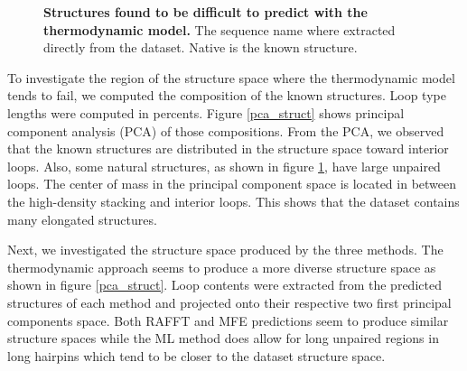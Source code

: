 \documentclass[a4paper,12pt]{article}
\begin{document}
\begin{figure}[!ht]
  \caption{\textbf{Structures found to be difficult to predict with the
      thermodynamic model.} The sequence name where extracted directly from the
    dataset. Native is the known structure.\label{diff_struct}}
\end{figure}

To investigate the region of the structure space where the thermodynamic model
tends to fail, we computed the composition of the known structures. Loop type
lengths were computed in percents. Figure \ref{pca_struct} shows principal
component analysis (PCA) of those compositions. From the PCA, we observed that
the known structures are distributed in the structure space toward interior
loops. Also, some natural structures, as shown in figure \ref{diff_struct}, have
large unpaired loops. The center of mass in the principal component space is
located in between the high-density stacking and interior loops. This shows that
the dataset contains many elongated structures.

Next, we investigated the structure space produced by the three methods. The
thermodynamic approach seems to produce a more diverse structure space as shown
in figure \ref{pca_struct}. Loop contents were extracted from the predicted
structures of each method and projected onto their respective two first
principal components space. Both RAFFT and MFE predictions seem to produce
similar structure spaces while the ML method does allow for long unpaired
regions in long hairpins which tend to be closer to the dataset structure space.
\end{document}
